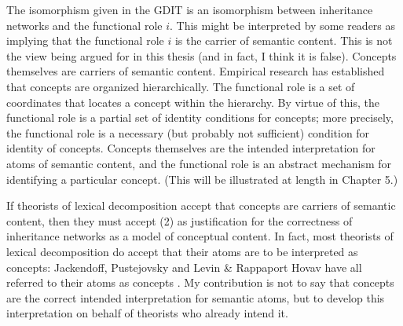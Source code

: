 The isomorphism given in the GDIT is an isomorphism between inheritance networks and the functional role $i$. This might be interpreted by some readers as implying that the functional role $i$ is the carrier of semantic content. This is not the view being argued for in this thesis (and in fact, I think it is false). Concepts themselves are carriers of semantic content. Empirical research has established that concepts are organized hierarchically. The functional role is a set of coordinates that locates a concept within the hierarchy. By virtue of this, the functional role is a partial set of identity conditions for concepts; more precisely, the functional role is a necessary (but probably not sufficient) condition for identity of concepts. Concepts themselves are the intended interpretation for atoms of semantic content, and the functional role is an abstract mechanism for identifying a particular concept. (This will be illustrated at length in Chapter 5.)

If theorists of lexical decomposition accept that concepts are carriers of semantic content, then they must accept (2) as justification for the correctness of inheritance networks as a model of conceptual content. In fact, most theorists of lexical decomposition do accept that their atoms are to be interpreted as concepts: Jackendoff, Pustejovsky and Levin \& Rappaport Hovav have all referred to their atoms as concepts \cite{jackendoff_semantics_1983} \cite{levin_lexical_2008} \cite{pustejovsky_generative_1998}. My contribution is not to say that concepts are the correct intended interpretation for semantic atoms, but to develop this interpretation on behalf of theorists who already intend it.

\clearpage
